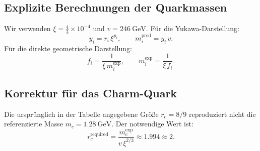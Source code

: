 	\subsection{Explizite Berechnungen der Quarkmassen}
	\label{subsec:quark_calculations}
	
	Wir verwenden $\xi=\tfrac{4}{3}\times10^{-4}$ und $v=246\ \mathrm{GeV}$.
	Für die Yukawa-Darstellung:
	\[
	y_i = r_i\,\xi^{p_i},\qquad m_i^{\text{pred}}=y_i\,v.
	\]
	Für die direkte geometrische Darstellung:
	\[
	f_i=\frac{1}{\xi\, m_i^{\text{exp}}},\qquad m_i^{\text{exp}}=\frac{1}{\xi\, f_i}.
	\]
	
	\begin{table}[H]
		\centering
		\caption{Yukawa-Vorhersagen mit korrigierten $r_i,p_i$ und Vergleich mit Referenzmassen (PDG~2024).}
		\label{tab:quark_yukawa_predictions}
	\end{table}
	
	\subsection{Korrektur für das Charm-Quark}
	\label{subsec:charm_correction}
	
	Die ursprünglich in der Tabelle angegebene Größe $r_c=8/9$ reproduziert nicht die referenzierte Masse $m_c=1.28\ \mathrm{GeV}$. Der notwendige Wert ist:
	\[
	r_c^{\text{required}}=\frac{m_c^{\text{exp}}}{v\,\xi^{2/3}}\approx 1.994 \approx 2.
	\]
	
